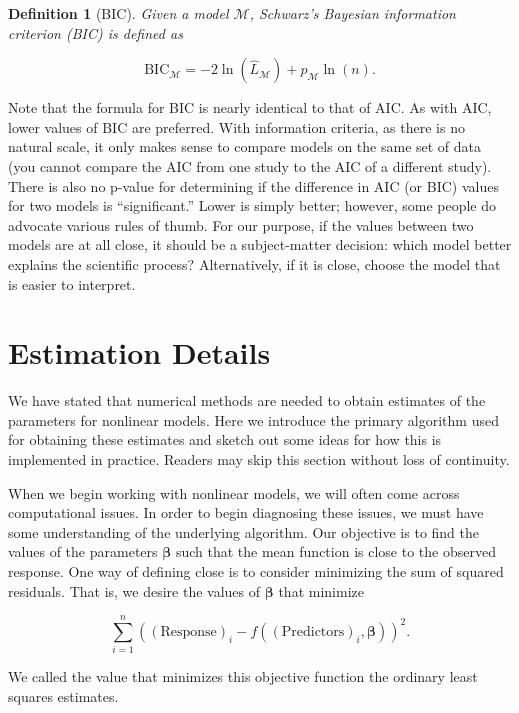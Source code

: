\documentclass[
]{book}
\theoremstyle{plain}
\theoremstyle{mydefn}
\newtheorem{definition}{Definition}[chapter]
\theoremstyle{myexmpl}
\theoremstyle{remark}
\begin{document}
\begin{definition}[BIC]
Given a model \(\mathcal{M}\), Schwarz's Bayesian information criterion (BIC) is defined as

\[\text{BIC}_{\mathcal{M}} = -2\ln\left(\widehat{L}_{\mathcal{M}}\right) + p_{\mathcal{M}} \ln(n).\]
\end{definition}

Note that the formula for BIC is nearly identical to that of AIC. As with AIC, lower values of BIC are preferred. With information criteria, as there is no natural scale, it only makes sense to compare models on the same set of data (you cannot compare the AIC from one study to the AIC of a different study). There is also no p-value for determining if the difference in AIC (or BIC) values for two models is ``significant.'' Lower is simply better; however, some people do advocate various rules of thumb. For our purpose, if the values between two models are at all close, it should be a subject-matter decision: which model better explains the scientific process? Alternatively, if it is close, choose the model that is easier to interpret.

\hypertarget{nlm-estimation}{%
\chapter{Estimation Details}\label{nlm-estimation}}

We have stated that numerical methods are needed to obtain estimates of the parameters for nonlinear models. Here we introduce the primary algorithm used for obtaining these estimates and sketch out some ideas for how this is implemented in practice. Readers may skip this section without loss of continuity.

When we begin working with nonlinear models, we will often come across computational issues. In order to begin diagnosing these issues, we must have some understanding of the underlying algorithm. Our objective is to find the values of the parameters \(\boldsymbol{\beta}\) such that the mean function is close to the observed response. One way of defining close is to consider minimizing the sum of squared residuals. That is, we desire the values of \(\boldsymbol{\beta}\) that minimize

\[\sum_{i=1}^{n} \left((\text{Response})_i - f\left((\text{Predictors})_i, \boldsymbol{\beta}\right)\right)^2.\]

We called the value that minimizes this objective function the ordinary least squares estimates.
\end{document}
